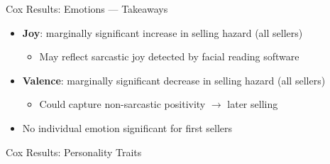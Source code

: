 \documentclass{beamer}
\begin{document}
\begin{frame}{Cox Results: Emotions --- Takeaways}
\begin{itemize}
    \item \textbf{Joy}: marginally significant increase in selling hazard (all sellers)
    \begin{itemize}
        \item May reflect sarcastic joy detected by facial reading software \citep{forman2020capturing}
    \end{itemize}
    \item \textbf{Valence}: marginally significant decrease in selling hazard (all sellers)
    \begin{itemize}
        \item Could capture non-sarcastic positivity $\rightarrow$ later selling
    \end{itemize}
    \item No individual emotion significant for first sellers
\end{itemize}
\end{frame}


\begin{frame}{Cox Results: Personality Traits}
\begin{center}
\end{center}
\end{frame}
\end{document}
